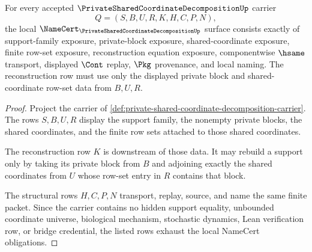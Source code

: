 \begin{theorem}
\label{thm:private-shared-coordinate-decomposition-namecert-obligations}
For every accepted $\PrivateSharedCoordinateDecompositionUp$ carrier
$$
Q=(S,B,U,R,K,H,C,P,N),
$$
the local $\NameCert_{\PrivateSharedCoordinateDecompositionUp}$ surface consists exactly of support-family exposure, private-block exposure, shared-coordinate exposure, finite row-set exposure, reconstruction equation exposure, componentwise $\hsame$ transport, displayed $\Cont$ replay, $\Pkg$ provenance, and local naming. The reconstruction row must use only the displayed private block and shared-coordinate row-set data from $B,U,R$.
\end{theorem}
\begin{proof}
Project the carrier of \autoref{def:private-shared-coordinate-decomposition-carrier}. The rows $S,B,U,R$ display the support family, the nonempty private blocks, the shared coordinates, and the finite row sets attached to those shared coordinates.

The reconstruction row $K$ is downstream of those data. It may rebuild a support only by taking its private block from $B$ and adjoining exactly the shared coordinates from $U$ whose row-set entry in $R$ contains that block.

The structural rows $H,C,P,N$ transport, replay, source, and name the same finite packet. Since the carrier contains no hidden support equality, unbounded coordinate universe, biological mechanism, stochastic dynamics, Lean verification row, or bridge credential, the listed rows exhaust the local NameCert obligations.
\end{proof}

